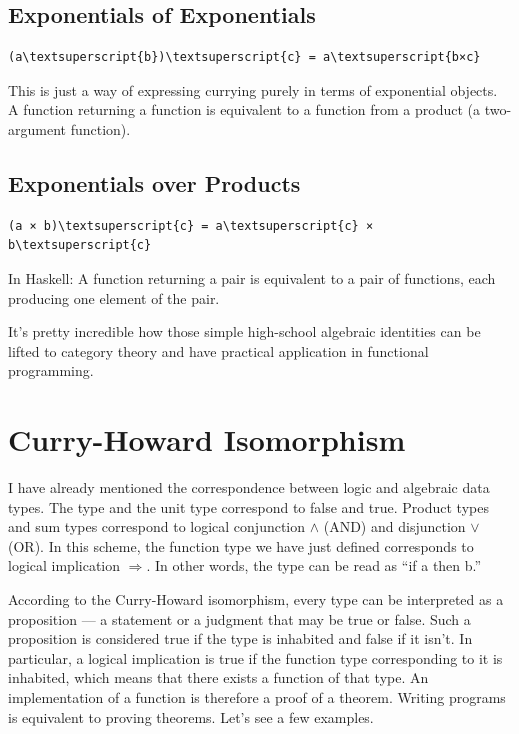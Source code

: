 \subsection{Exponentials of
Exponentials}\label{exponentials-of-exponentials}

\begin{Verbatim}[commandchars=\\\{\}]
(a\textsuperscript{b})\textsuperscript{c} = a\textsuperscript{b×c}
\end{Verbatim}
This is just a way of expressing currying purely in terms of exponential
objects. A function returning a function is equivalent to a function
from a product (a two-argument function).

\subsection{Exponentials over
Products}\label{exponentials-over-products}

\begin{Verbatim}[commandchars=\\\{\}]
(a × b)\textsuperscript{c} = a\textsuperscript{c} × b\textsuperscript{c}
\end{Verbatim}
In Haskell: A function returning a pair is equivalent to a pair of
functions, each producing one element of the pair.

It's pretty incredible how those simple high-school algebraic identities
can be lifted to category theory and have practical application in
functional programming.

\section{Curry-Howard Isomorphism}\label{curry-howard-isomorphism}

I have already mentioned the correspondence between logic and algebraic
data types. The  type and the unit type \code{()}
correspond to false and true. Product types and sum types correspond to
logical conjunction \ensuremath{\wedge} (AND) and disjunction \ensuremath{\vee} (OR). In this scheme, the
function type we have just defined corresponds to logical implication \ensuremath{\Rightarrow}.
In other words, the type  can be read as ``if
a then b.''

According to the Curry-Howard isomorphism, every type can be interpreted
as a proposition --- a statement or a judgment that may be true or
false. Such a proposition is considered true if the type is inhabited
and false if it isn't. In particular, a logical implication is true if
the function type corresponding to it is inhabited, which means that
there exists a function of that type. An implementation of a function is
therefore a proof of a theorem. Writing programs is equivalent to
proving theorems. Let's see a few examples.

